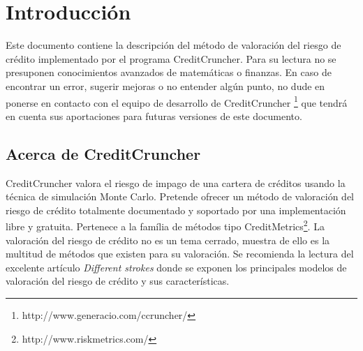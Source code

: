 
%
%
%
%
%
%
%
%

\chapter{Introducci\'on}
\label{sec:introduction}

Este documento contiene la descripci\'on del m\'etodo de valoraci\'on del riesgo
de cr\'edito implementado por el programa CreditCruncher. Para su lectura no se 
presuponen conocimientos avanzados de matem\'aticas o finanzas. En caso de 
encontrar un error, sugerir mejoras o no entender alg\'un punto,
no dude en ponerse en contacto con el equipo de desarrollo de CreditCruncher
\footnote{http://www.generacio.com/ccruncher/} que tendr\'a en cuenta sus 
aportaciones para futuras versiones de este documento.


\section{Acerca de CreditCruncher}

CreditCruncher valora el riesgo de impago de una cartera de cr\'editos usando la 
t\'ecnica de simulaci\'on Monte Carlo. Pretende ofrecer un m\'etodo de valoraci\'on 
del riesgo de cr\'edito totalmente documentado y soportado por una implementaci\'on 
libre y gratuita. Pertenece a la fam\'ilia de m\'etodos tipo 
CreditMetrics\footnote{http://www.riskmetrics.com/}.
La valoraci\'on del riesgo de cr\'edito no es un tema cerrado, muestra de ello 
es la multitud de m\'etodos que existen para su valoraci\'on. Se recomienda la 
lectura del excelente art\'iculo \emph{Different strokes} \cite{Risk:Dif_Str} 
donde se exponen los principales modelos de valoraci\'on del riesgo de cr\'edito 
y sus caracter\'isticas. 


